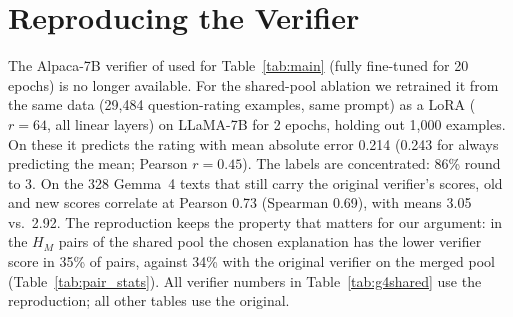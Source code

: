 {

\section{Reproducing the Verifier}
\label{sec:verifier_repro}

The Alpaca-7B verifier of \citet{bao2025exploring} used for Table~\ref{tab:main} (fully fine-tuned for 20 epochs) is no longer available. For the shared-pool ablation we retrained it from the same data (29,484 question-rating examples, same prompt) as a LoRA ($r{=}64$, all linear layers) on LLaMA-7B for 2 epochs, holding out 1,000 examples. On these it predicts the rating with mean absolute error 0.214 (0.243 for always predicting the mean; Pearson $r{=}0.45$). The labels are concentrated: 86\% round to 3. On the 328 Gemma~4 texts that still carry the original verifier's scores, old and new scores correlate at Pearson 0.73 (Spearman 0.69), with means 3.05 vs.\ 2.92. The reproduction keeps the property that matters for our argument: in the $H_M$ pairs of the shared pool the chosen explanation has the lower verifier score in 35\% of pairs, against 34\% with the original verifier on the merged pool (Table~\ref{tab:pair_stats}). All verifier numbers in Table~\ref{tab:g4shared} use the reproduction; all other tables use the original.
}
